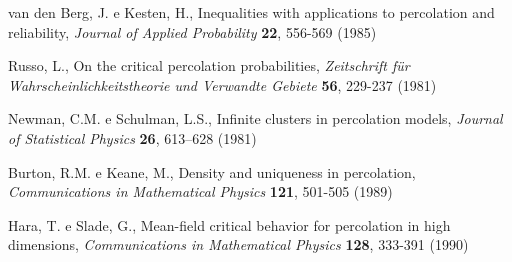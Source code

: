 \begin{thebibliography}{99}
 van den Berg, J. e Kesten, H., Inequalities with applications
  to percolation and reliability, {\em Journal of Applied Probability} {\bf
    22}, 556-569 (1985)

 Russo, L., On the critical percolation probabilities,
{\em Zeitschrift für Wahrscheinlichkeitstheorie und Verwandte Gebiete} 
{\bf 56}, 229-237 (1981)

 Newman, C.M. e Schulman, L.S., 
                Infinite clusters in percolation models,  
                {\em Journal of Statistical Physics} {\bf 26}, 613--628 (1981)

 Burton, R.M. e Keane, M., Density and uniqueness in
  percolation, {\em Communications in Mathematical Physics} {\bf 121},
501-505 (1989)

 Hara, T. e Slade, G., Mean-field critical behavior for
  percolation in high dimensions, {\em Communications in Mathematical
    Physics} {\bf 128}, 333-391 (1990)

\end{thebibliography}

